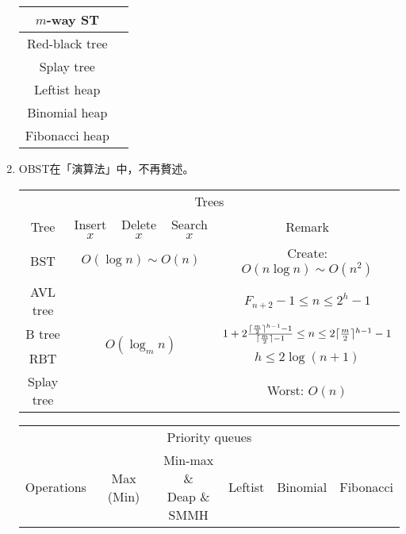 \begin{enumerate}
\begin{table}[H]
\begin{tabular}{|c|c|}
            \hline
            $m$-way ST & \pageref{m-wayst} \\
            \hline
            Red-black tree & \pageref{rbt} \\
            \hline
            Splay tree & \pageref{splaytree} \\
            \hline
            Leftist heap & \pageref{leftistheap} \\
            \hline
            Binomial heap & \pageref{binomialheap} \\
            \hline
            Fibonacci heap & \pageref{fibheap} \\
            \hline
        \end{tabular}
    \end{table}
    \item OBST在「演算法」中，不再贅述。
    \begin{table}[H]
        \centering
        \begin{tabular}{|c|c|c|c|c|}
            \hline
            \multicolumn{5}{|c|}{Trees} \\
            \Xhline{3\arrayrulewidth}
            Tree & Insert $x$ & Delete $x$ & Search $x$ & Remark \\
            \Xhline{2\arrayrulewidth}
            BST & \multicolumn{3}{c|}{$O(\log n) \sim O(n)$} & Create: $O(n\log n) \sim O(n^2)$ \\
            \hline
            AVL tree & \multicolumn{3}{c|}{\multirow{4}{*}{$O(\log_m n)$}} & $F_{n + 2} - 1 \le n \le 2^h - 1$ \\
            \cline{1-1}\cline{5-5}
            B tree & \multicolumn{3}{c|}{} & $1 + 2\frac{\lceil\frac{m}{2}\rceil^{h - 1} - 1}{\lceil\frac{m}{2}\rceil - 1} \le n \le 2\lceil\frac{m}{2}\rceil^{h - 1} - 1$ \\
            \cline{1-1}\cline{5-5}
            RBT & \multicolumn{3}{c|}{} & $h \le 2\log (n + 1)$ \\
            \cline{1-1}\cline{5-5}
            Splay tree & \multicolumn{3}{c|}{} & Worst: $O(n)$ \\
            \hline
        \end{tabular}
    \end{table}
    \begin{table}[H]
        \centering
        \begin{tabular}{|c|c|c|c|c|c|}
            \hline
            \multicolumn{6}{|c|}{Priority queues} \\
            \Xhline{3\arrayrulewidth}
            Operations & Max (Min) & \makecell{Min-max \&\\Deap \&\\SMMH} & Leftist & Binomial & Fibonacci \\

\end{tabular}
\end{table}
\end{enumerate}

